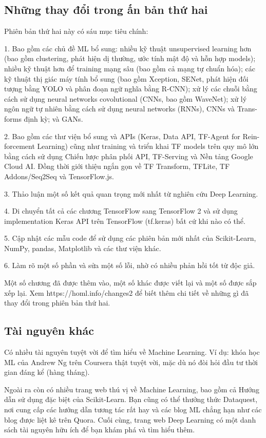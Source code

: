 \subsection{Những thay đổi trong ấn bản thứ hai}

Phiên bản thứ hai này có sáu mục tiêu chính:

1. Bao gồm các chủ đề ML bổ sung: nhiều kỹ thuật unsupervised learning hơn (bao gồm clustering, phát hiện dị thường, ước tính mật độ và hỗn hợp models); nhiều kỹ thuật hơn để training mạng sâu (bao gồm cả mạng tự chuẩn hóa); các kỹ thuật thị giác máy tính bổ sung (bao gồm Xception, SENet, phát hiện đối tượng bằng YOLO và phân đoạn ngữ nghĩa bằng R-CNN); xử lý các chuỗi bằng cách sử dụng neural networks covolutional (CNNs, bao gồm WaveNet); xử lý ngôn ngữ tự nhiên bằng cách sử dụng neural networks (RNNs), CNNs và Trans-forms định kỳ; và GANs.

2. Bao gồm các thư viện bổ sung và APIs (Keras, Data API, TF-Agent for Rein-forcement Learning) cũng như training và triển khai TF models trên quy mô lớn bằng cách sử dụng Chiến lược phân phối API, TF-Serving và Nền tảng Google Cloud AI. Đồng thời giới thiệu ngắn gọn về TF Transform, TFLite, TF Addons/Seq2Seq và TensorFlow.js.

3. Thảo luận một số kết quả quan trọng mới nhất từ ​​nghiên cứu Deep Learning.

4. Di chuyển tất cả các chương TensorFlow sang TensorFlow 2 và sử dụng implementation Keras API trên TensorFlow (tf.keras) bất cứ khi nào có thể.

5. Cập nhật các mẫu code để sử dụng các phiên bản mới nhất của Scikit-Learn, NumPy, pandas, Matplotlib và các thư viện khác.

6. Làm rõ một số phần và sửa một số lỗi, nhờ có nhiều phản hồi tốt từ độc giả.

Một số chương đã được thêm vào, một số khác được viết lại và một số được sắp xếp lại. Xem https://homl.info/changes2 để biết thêm chi tiết về những gì đã thay đổi trong phiên bản thứ hai.

\subsection{Tài nguyên khác}

Có nhiều tài nguyên tuyệt vời để tìm hiểu về Machine Learning. Ví dụ: khóa học ML của Andrew Ng trên Coursera thật tuyệt vời, mặc dù nó đòi hỏi đầu tư thời gian đáng kể (hàng tháng).

Ngoài ra còn có nhiều trang web thú vị về Machine Learning, bao gồm cả Hướng dẫn sử dụng đặc biệt của Scikit-Learn. Bạn cũng có thể thưởng thức Dataquest, nơi cung cấp các hướng dẫn tương tác rất hay và các blog ML chẳng hạn như các blog được liệt kê trên Quora. Cuối cùng, trang web Deep Learning có một danh sách tài nguyên hữu ích để bạn khám phá và tìm hiểu thêm.

